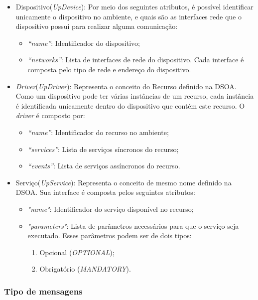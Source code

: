 \begin{itemize}
	\item Dispositivo(\emph{UpDevice}): Por meio dos seguintes atributos, é possível identificar unicamente o dispositivo no ambiente, e quais são as interfaces rede que o dispositivo possui para realizar alguma comunicação:
		\begin{itemize}
			\item \emph{``name''}: Identificador do dispositivo;
			\item \emph{``networks''}: Lista de interfaces de rede do dispositivo. Cada interface é composta pelo tipo de rede e endereço do dispositivo.
		\end{itemize}
	\item \emph{Driver}(\emph{UpDriver}): Representa o conceito do Recurso definido na DSOA. Como um dispositivo pode ter várias instâncias de um recurso, cada instância é identificada unicamente dentro do dispositivo que contém este recurso. O \emph{driver} é composto por:
		\begin{itemize}
			\item \emph{``name''}: Identificador do recurso no ambiente;
			\item \emph{``services''}: Lista de serviços síncronos do recurso;
			\item \emph{``events''}: Lista de serviços assíncronos do recurso.
		\end{itemize}
	\item Serviço(\emph{UpService}): Representa o conceito de mesmo nome definido na DSOA. Sua interface é composta pelos seguintes atributos:
		\begin{itemize}
			\item \emph{"name"}: Identificador do serviço disponível no recurso;
			\item \emph{"parameters"}: Lista de parâmetros necessários para que o serviço seja executado. Esses parâmetros podem ser de dois tipos:
				\begin{enumerate}
					\item Opcional (\emph{OPTIONAL});
					\item Obrigatório (\emph{MANDATORY}).
				\end{enumerate}
		\end{itemize}
\end{itemize}

\subsubsection{Tipo de mensagens}

